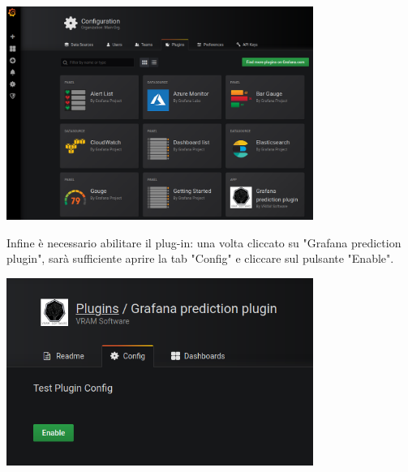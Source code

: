 \begin{center}
	\includegraphics[width=10cm]{img/inserimento-plugin2.png}
\end{center}

Infine è necessario abilitare il plug-in: una volta cliccato su "Grafana prediction plugin", sarà sufficiente aprire la tab "Config" e cliccare sul pulsante "Enable".

\begin{center}
	\includegraphics[width=10cm]{img/inserimento-plugin3.png}
\end{center}

